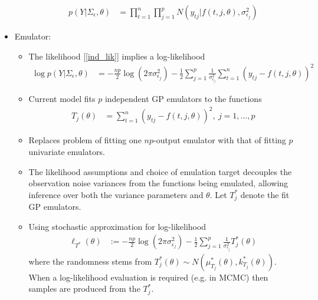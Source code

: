 \documentclass[12pt]{article}
\begin{document}
\begin{itemize}
\begin{itemize}
		\begin{align}
		p(Y|\Sigma_\epsilon, \theta) &= \prod_{t = 1}^{n} \prod_{j = 1}^{p} N(y_{tj}|f(t, j, \theta), \sigma^2_{\epsilon_j}) \label{ind_lik}
		\end{align}
	\end{itemize}
\item Emulator:
	\begin{itemize}
	\item The likelihood [\ref{ind_lik}] implies a log-likelihood
	\begin{align}
	\log p(Y|\Sigma_\epsilon, \theta) &= -\frac{np}{2} \log(2\pi \sigma^2_{\epsilon_j}) - \frac{1}{2} \sum_{j = 1}^{p} \frac{1}{\sigma^2_{\epsilon_j}} \sum_{t = 1}^{n} (y_{tj} - f(t, j, \theta))^2
	\end{align}
	\item Current model fits $p$ independent GP emulators to the functions
	\begin{align}
	T_j(\theta) &= \sum_{t = 1}^{n} (y_{tj} - f(t, j, \theta))^2, \ j = 1, \dots, p
	\end{align} 
	\item Replaces problem of fitting one $np$-output emulator with that of fitting $p$ univariate emulators. 
	\item The likelihood assumptions and choice of emulation target decouples the observation noise variances from the functions being emulated, allowing inference over both the variance parameters
	and $\theta$. Let $T_j^*$ denote the fit GP emulators. 
	\item Using stochastic approximation for log-likelihood 
	\begin{align}
	\ell_{T^*}(\theta) &:= -\frac{np}{2} \log(2\pi \sigma^2_{\epsilon_j}) - \frac{1}{2} \sum_{j = 1}^{p} \frac{1}{\sigma^2_{\epsilon_j}} T_j^*(\theta)
	\end{align}
	where the randomness stems from $T_j^*(\theta) \sim N(\mu^*_{T_j}(\theta), k^*_{T_j}(\theta))$. When a log-likelihood evaluation is required (e.g. in MCMC) then samples are produced from the $T_j^*$.
	\end{itemize}
\end{itemize}
\end{document}
